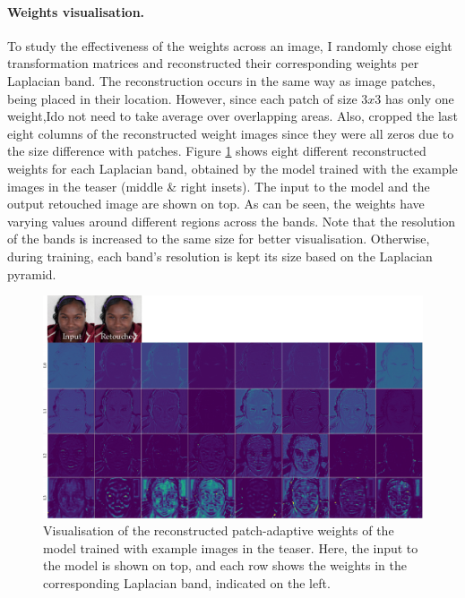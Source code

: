 \paragraph{Weights visualisation.} To study the effectiveness of the weights across an image, I randomly chose eight transformation matrices and reconstructed their corresponding weights per Laplacian band. The reconstruction occurs in the same way as image patches, being placed in their location. However, since each patch of size $3 x 3$ has only one weight,Ido not need to take average over overlapping areas. Also, cropped the last eight columns of the reconstructed weight images since they were all zeros due to the size difference with patches. Figure \ref{fig:weight-vis} shows eight different reconstructed weights for each Laplacian band, obtained by the model trained with the example images in the teaser (middle \& right insets). The input to the model and the output retouched image are shown on top. As can be seen, the weights have varying values around different regions across the bands. Note that the resolution of the bands is increased to the same size for better visualisation. Otherwise, during training, each band’s resolution is kept its size based on the Laplacian pyramid.

\begin{figure}%
\centering
\includegraphics[width=\columnwidth]{Chapters/detail-retouching-figs/weight_visualise.pdf}
    \caption{Visualisation of the reconstructed patch-adaptive weights of the model trained with example images in the teaser. Here, the input to the model is shown on top, and each row shows the weights in the corresponding Laplacian band, indicated on the left.}

\label{fig:weight-vis}
\end{figure}

